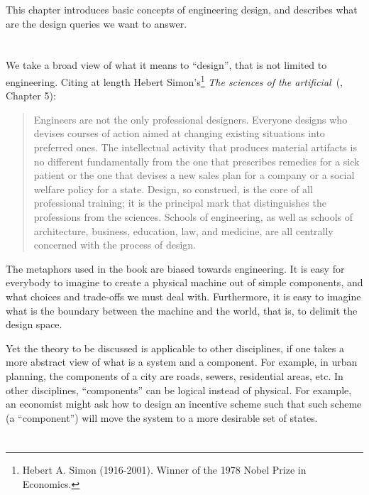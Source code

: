 This chapter introduces basic concepts of engineering design, and describes what are the design queries we want to answer.


\section{}

We take a broad view of what it means to ``design'', that is not limited to engineering. Citing at length
Hebert Simon's\footnote{Hebert A. Simon (1916-2001). Winner of the 1978 Nobel Prize in Economics.}
\emph{The sciences of the artificial}~(\cite{hebert96sciences}, Chapter 5):

\begin{quote}
    Engineers are not the only professional designers. Everyone designs who devises courses of action aimed at changing existing situations into preferred ones. The intellectual activity that produces material artifacts is no different fundamentally from the one that prescribes remedies for a sick patient or the one that devises a new sales plan for a company or a social welfare policy for a state. Design, so construed, is the core of all professional training; it is the principal mark that distinguishes the professions from the sciences. Schools of engineering, as well as schools of architecture, business, education, law, and medicine, are all centrally concerned with the process of design.
\end{quote}

The metaphors used in the book are biased towards engineering.
It is easy for everybody to imagine to create a physical machine out of simple components, and what choices and trade-offs we must deal with.
Furthermore, it is easy to imagine what is the boundary between the machine and the world, that is, to delimit the design space.

Yet the theory to be discussed is applicable to other disciplines, if one takes a more abstract view of what is a system and a component.
For example, in urban planning, the components of a city are roads, sewers, residential areas, etc.
In other disciplines, ``components'' can be logical instead of physical.
For example, an economist might ask how to design an incentive scheme such that such scheme (a ``component'') will move the system to a more
desirable set of states.


\section{}

